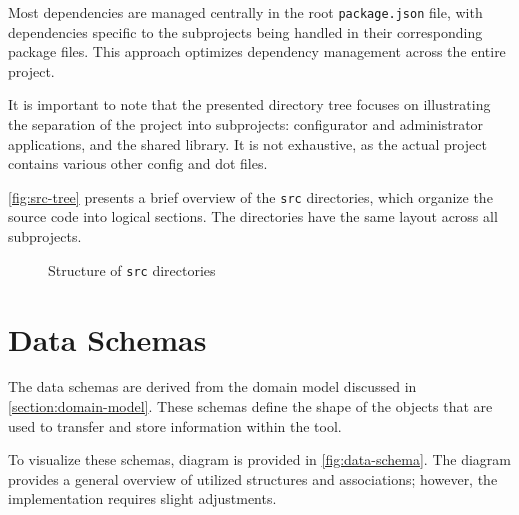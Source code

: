 Most dependencies are managed centrally in the root \texttt{package.json} file, with dependencies specific to the subprojects being handled in their corresponding package files. This approach optimizes dependency management across the entire project.

It is important to note that the presented directory tree focuses on illustrating the separation of the project into subprojects: configurator and administrator applications, and the shared library. It is not exhaustive, as the actual project contains various other config and dot files.

\autoref{fig:src-tree} presents a brief overview of the \texttt{src} directories, which organize the source code into logical sections. The directories have the same layout across all subprojects.

\begin{figure}[h]
    \centering
    \begin{minipage}{\textwidth}
    \end{minipage}
    \caption{Structure of \texttt{src} directories}
    \label{fig:src-tree}
\end{figure}

\section{Data Schemas} \label{section:data-schemas}

The data schemas are derived from the domain model discussed in \autoref{section:domain-model}. These schemas define the shape of the objects that are used to transfer and store information within the tool. 

To visualize these schemas,  diagram is provided in \autoref{fig:data-schema}. The diagram provides a general overview of utilized structures and associations; however, the implementation requires slight adjustments.

